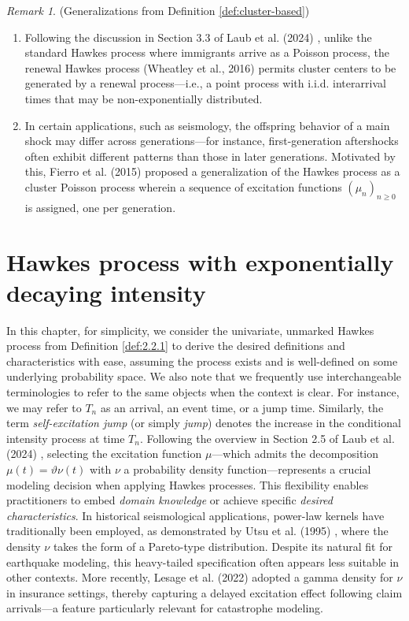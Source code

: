 \documentclass[12pt,a4paper]{report}
\theoremstyle{plain}
\theoremstyle{definition}
\theoremstyle{remark}
\newtheorem{remark}{Remark}[section]
\newcommand{\1}{\mathbf{1}}
\begin{document}
\begin{remark}{(Generalizations from Definition \ref{def:cluster-based})}

\begin{enumerate}[label=(\roman*),leftmargin=2.2em]
\item
Following the discussion in Section 3.3 of Laub et al. (2024) \cite{LLPT24}, unlike the standard Hawkes process where immigrants arrive as a Poisson process, the renewal Hawkes process (Wheatley et al., 2016) \cite{Whe16} permits cluster centers to be generated by a renewal process---i.e., a point process with i.i.d. interarrival times that may be non-exponentially distributed.
\item
In certain applications, such as seismology, the offspring behavior of a main shock may differ across generations---for instance, first-generation aftershocks often exhibit different patterns than those in later generations. Motivated by this, Fierro et al. (2015) \cite{Fie15} proposed a generalization of the Hawkes process as a cluster Poisson process wherein a sequence of excitation functions $(\mu_n)_{n\ge 0}$ is assigned, one per generation.
\end{enumerate}
\end{remark}

\chapter{Hawkes process with exponentially decaying intensity}
\label{chap:5}
In this chapter, for simplicity, we consider the univariate, unmarked Hawkes process from Definition \ref{def:2.2.1} to derive the desired definitions and characteristics with ease, assuming the process exists and is well-defined on some underlying probability space. We also note that we frequently use interchangeable terminologies to refer to the same objects when the context is clear. For instance, we may refer to $T_n$ as an arrival, an event time, or a jump time. Similarly, the term \emph{self-excitation jump} (or simply \emph{jump}) denotes the increase in the conditional intensity process at time $T_n$.  Following the overview in Section 2.5 of Laub et al. (2024) \cite{LLPT24}, selecting the excitation function $\mu$—which admits the decomposition $\mu(t) = \vartheta \nu(t)$ with $\nu$ a probability density function—represents a crucial modeling decision when applying Hawkes processes. This flexibility enables practitioners to embed \emph{domain knowledge} or achieve specific \emph{desired characteristics}. In historical seismological applications, power-law kernels have traditionally been employed, as demonstrated by Utsu et al. (1995) \cite{Uts95}, where the density $\nu$ takes the form of a Pareto-type distribution. Despite its natural fit for earthquake modeling, this heavy-tailed specification often appears less suitable in other contexts. More recently, Lesage et al. (2022) \cite{Les22} adopted a gamma density for $\nu$ in insurance settings, thereby capturing a delayed excitation effect following claim arrivals—a feature particularly relevant for catastrophe modeling.
\end{document}
